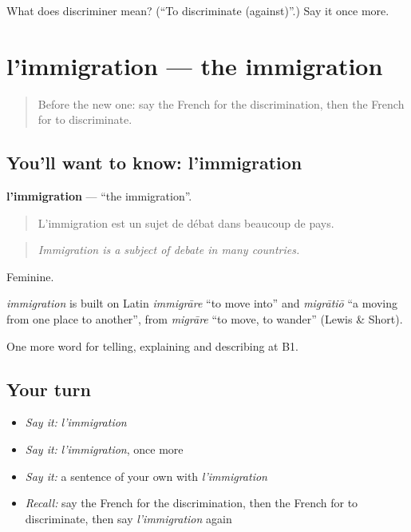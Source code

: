 \begin{tcolorbox}[breakable,colback=teal!4,colframe=teal!35!black,title={Before you move on}]
What does discriminer mean? (\textquotedblleft{}To discriminate (against)\textquotedblright{}.) Say it once more.
\end{tcolorbox}
\section[l'immigration]{l'immigration — the immigration}

\label{lesson:FR-C365-immigration}



\begin{quote}
Before the new one: say the French for the discrimination, then the French for to discriminate.
\end{quote}

\subsection*{You'll want to know: l'immigration}
\textbf{l'immigration} — \textquotedblleft{}the immigration\textquotedblright{}.

\begin{quote}
L'immigration est un sujet de débat dans beaucoup de pays.
\end{quote}

\begin{quote}
\emph{Immigration is a subject of debate in many countries.}
\end{quote}

Feminine.

\begin{cousinweb}
\emph{immigration} is built on Latin \emph{immigrāre} \textquotedblleft{}to move into\textquotedblright{} and \emph{migrātiō} \textquotedblleft{}a moving from one place to another\textquotedblright{}, from \emph{migrāre} \textquotedblleft{}to move, to wander\textquotedblright{} (Lewis \& Short).
\end{cousinweb}

\begin{grammarlens}[title={What you've built}]
One more word for telling, explaining and describing at B1.
\end{grammarlens}

\subsection*{Your turn}
\begin{itemize}
\raggedright
  \item \emph{Say it:} \emph{l'immigration}
  \item \emph{Say it:} \emph{l'immigration}, once more
  \item \emph{Say it:} a sentence of your own with \emph{l'immigration}
  \item \emph{Recall:} say the French for the discrimination, then the French for to discriminate, then say \emph{l'immigration} again
\end{itemize}

